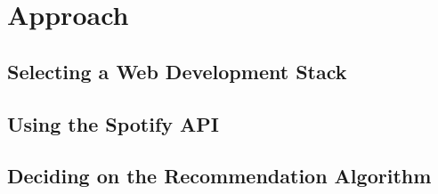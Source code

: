 \chapter{Approach}
\label{ch:Approach}

\section{Selecting a Web Development Stack}

\section{Using the Spotify API}

\section{Deciding on the Recommendation Algorithm}
